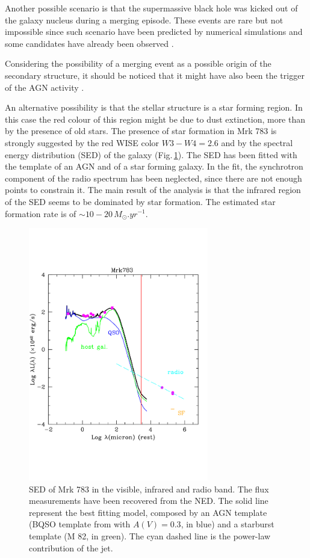 \documentclass[../thesis.tex]{subfiles}
\begin{document}
Another possible scenario is that the supermassive black hole was kicked out of the galaxy nucleus during a merging episode.
These events are rare but not impossible since such scenario have been predicted by numerical simulations and some candidates have already been observed \citep[for a review see][]{Komossa12}.

Considering the possibility of a merging event as a possible origin of the secondary structure, it should be noticed that it might have also been the trigger of the AGN activity \citep{Hong15}.

An alternative possibility is that the stellar structure is a star forming region.
In this case the red colour of this region might be due to dust extinction, more than by the presence of old stars.
The presence of star formation in Mrk 783 is strongly suggested by the red WISE color $W3-W4=2.6$ and by the spectral energy distribution (SED) of the galaxy (Fig.\,\ref{fig:SED_mrk}).
The SED has been fitted with the template of an AGN and of a star forming galaxy.
In the fit, the synchrotron component of the radio spectrum has been neglected, since there are not enough points to constrain it.
The main result of the analysis is that the infrared region of the SED seems to be dominated by star formation.
The estimated star formation rate is of $\sim 10-20\,\si{M_{\odot}.yr^{-1}}$.

\begin{figure}
\centering
\includegraphics[width=0.7\textwidth]{images/paper3/mrk783_senza_UVOT.pdf} 
\caption[]{SED of Mrk 783 in the visible, infrared and radio band. The flux measurements have been recovered from the NED. The solid line represent the best fitting model, composed by an AGN template (BQSO template from \cite{polletta07} with $A(V)=0.3$, in blue) and a starburst template (M 82, in green).
The cyan dashed line is the power-law contribution of the jet.} 
\label{fig:SED_mrk}
\end{figure} 
\end{document}
